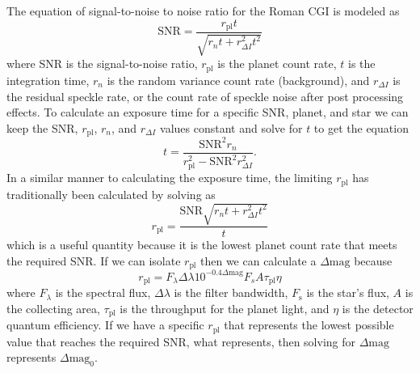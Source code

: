 The equation of signal-to-noise to noise ratio for the Roman CGI is modeled as
\begin{equation}
  \textrm{SNR} = \frac{r_\textrm{pl}t}{\sqrt{r_n t + r^2_{\Delta I} t^2}}
  \label{eq:2020SNR}
\end{equation}
where SNR is the signal-to-noise ratio, $r_\textrm{pl}$ is the planet count
rate, $t$ is the integration time, $r_n$ is the random variance count rate
(background), and $r_{\Delta I}$ is the residual speckle rate, or the count
rate of speckle noise after post processing effects. To calculate an exposure
time for a specific SNR, planet, and star we can keep the SNR, $r_\textrm{pl}$,
$r_n$, and $r_{\Delta I}$ values constant and solve for $t$ to get the equation 
\begin{equation}
  t = \frac{\textrm{SNR}^2 r_n}{r^2_\textrm{pl} - \textrm{SNR}^2 r^2_{\Delta I}}.
  \label{eq:2020t}
\end{equation}
In a similar manner to calculating the exposure time, the limiting $r_\textrm{pl}$
has traditionally been calculated by solving  as
\begin{equation}
  r_\textrm{pl} = \frac{\textrm{SNR} \sqrt{r_n t + r^2_{\Delta I} t^2}}{t}
  \label{eq:2020rpl}
\end{equation}
which is a useful quantity because it is the lowest planet count rate that meets
the required SNR. If we can isolate $r_\textrm{pl}$ then we can calculate a
$\Delta\textrm{mag}$ because
\begin{equation}
  r_\textrm{pl} = F_\lambda \Delta \lambda 10^{-0.4 \Delta \textrm{mag}} F_s A \tau_\textrm{pl} \eta
  \label{eq:2020rpl_expand}
\end{equation}
where $F_\lambda$ is the spectral flux, $\Delta \lambda$ is the filter
bandwidth, $F_\textrm{s}$ is the star's flux, $A$ is the collecting area,
$\tau_\textrm{pl}$ is the throughput for the planet light, and $\eta$ is the
detector quantum efficiency. If we have a specific $r_\textrm{pl}$ that
represents the lowest possible value that reaches the required SNR, what
 represents, then solving  for
$\Delta\textrm{mag}$ represents $\Delta\textrm{mag}_0$.

